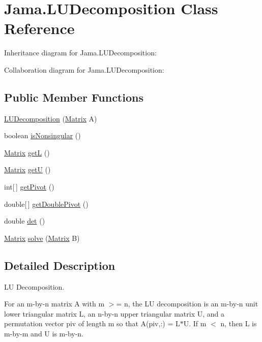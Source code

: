 \hypertarget{class_jama_1_1_l_u_decomposition}{\section{Jama.\+L\+U\+Decomposition Class Reference}
\label{class_jama_1_1_l_u_decomposition}
}


Inheritance diagram for Jama.\+L\+U\+Decomposition\+:


Collaboration diagram for Jama.\+L\+U\+Decomposition\+:
\subsection*{Public Member Functions}
\begin{DoxyCompactItemize}
\item 
\hyperlink{class_jama_1_1_l_u_decomposition_a50f7807a81de88f318886dfd0eb44cf8}{L\+U\+Decomposition} (\hyperlink{class_jama_1_1_matrix}{Matrix} A)
\item 
boolean \hyperlink{class_jama_1_1_l_u_decomposition_aa5a58918751ee6b2abc858542fb5ae47}{is\+Nonsingular} ()
\item 
\hyperlink{class_jama_1_1_matrix}{Matrix} \hyperlink{class_jama_1_1_l_u_decomposition_ac24a98b938dd29b58fa0e9db41618242}{get\+L} ()
\item 
\hyperlink{class_jama_1_1_matrix}{Matrix} \hyperlink{class_jama_1_1_l_u_decomposition_a1e7898faf116eb7997e75eefa00f2d01}{get\+U} ()
\item 
int\mbox{[}$\,$\mbox{]} \hyperlink{class_jama_1_1_l_u_decomposition_aa85e93ba287bc938514395c92c6c54cb}{get\+Pivot} ()
\item 
double\mbox{[}$\,$\mbox{]} \hyperlink{class_jama_1_1_l_u_decomposition_a69d68d7f0bcaa3b7bf005b1d8ce285c1}{get\+Double\+Pivot} ()
\item 
double \hyperlink{class_jama_1_1_l_u_decomposition_a474e4b7bd8370a40e96ecb4ea0694b46}{det} ()
\item 
\hyperlink{class_jama_1_1_matrix}{Matrix} \hyperlink{class_jama_1_1_l_u_decomposition_ad8dde76b65b15ce3839648708f4b9b41}{solve} (\hyperlink{class_jama_1_1_matrix}{Matrix} B)
\end{DoxyCompactItemize}


\subsection{Detailed Description}
L\+U Decomposition. 

For an m-\/by-\/n matrix A with m $>$= n, the L\+U decomposition is an m-\/by-\/n unit lower triangular matrix L, an n-\/by-\/n upper triangular matrix U, and a permutation vector piv of length m so that A(piv,\+:) = L$\ast$\+U. If m $<$ n, then L is m-\/by-\/m and U is m-\/by-\/n. 

